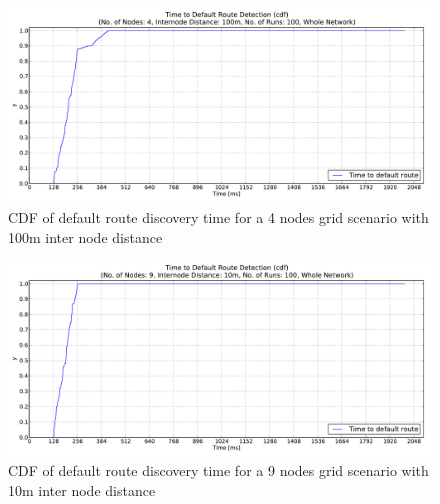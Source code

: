 \begin{figure}[htbp]
  \begin{center}
    \leavevmode
      \includegraphics[width=\textwidth]
      {Pics/results/4/MRHOF/grid/dist100_montecarlo_cdf_hist.pdf}
   \caption{CDF of default route discovery time for a 4 nodes grid scenario with 100m inter node distance}
   \label{fig:4_MRHOF_grid_100_cdf}
  \end{center}
\end{figure}

\begin{figure}[htbp]
  \begin{center}
    \leavevmode
      \includegraphics[width=\textwidth]
      {Pics/results/9/MRHOF/grid/dist10_montecarlo_cdf_hist.pdf}
   \caption{CDF of default route discovery time for a 9 nodes grid scenario with 10m inter node distance}
   \label{fig:9_MRHOF_grid_10_cdf}
  \end{center}
\end{figure}

